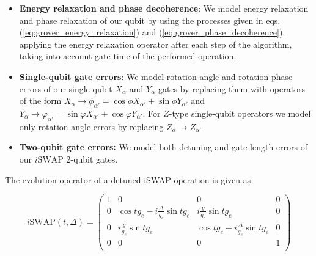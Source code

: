 \begin{itemize}
 \item {\bf Energy relaxation and phase decoherence}: We model energy relaxation and phase relaxation of our qubit by using the processes given in eqs. (\ref{eq:grover_energy_relaxation}) and (\ref{eq:grover_phase_decoherence}), applying the energy relaxation operator after each step of the algorithm, taking into account gate time of the performed operation.
 \item {\bf Single-qubit gate errors}: We model rotation angle and rotation phase errors of our single-qubit $X_\alpha$ and $Y_\alpha$ gates by replacing them with operators of the form $X_\alpha\to \phi_{\alpha'} = \cos{\phi}X_{\alpha'}+\sin{\phi}Y_{\alpha'}$ and $Y_\alpha \to \varphi_{\alpha'} = \sin{\varphi}X_{\alpha'}+\cos{\varphi}Y_{\alpha'}$. For $Z$-type single-qubit operators we model only rotation angle errors by replacing $Z_\alpha \to Z_{\alpha'}$ 
 \item {\bf Two-qubit gate errors:} We model both detuning and gate-length errors of our $i\mathrm{SWAP}$ 2-qubit gates.
\end{itemize}

The evolution operator of a detuned iSWAP operation is given as

\begin{equation}
i\mathrm{SWAP}(t,\Delta) = \left(
			\begin{array}{cccc}
				1 & 0 & 0 & 0 \\
				0 & \cos{t g_{e}}-i\frac{\Delta}{g_{e}}\sin{t g_{e}} & i \frac{g}{g_e}\sin{t g_{e}} & 0 \\
				0 & i\frac{g}{g_e}\sin{t g_{e}} & \cos{t g_{e}}+i\frac{\Delta}{g_{e}}\sin{t g_{e}} & 0 \\
				0 & 0 & 0 & 1 \\
			\end{array}
	\right) \label{eq:swap_with_detuning}
\end{equation}

